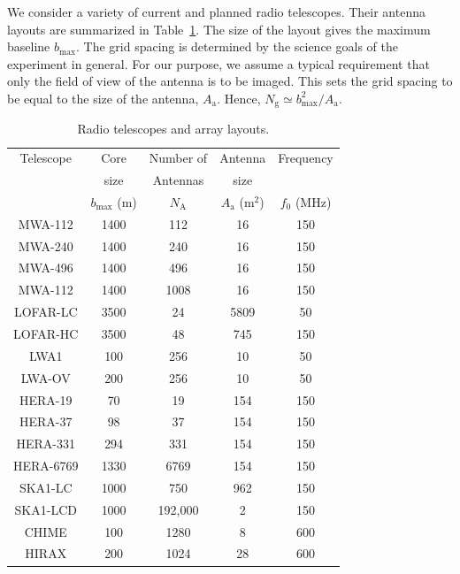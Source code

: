 \documentclass[a4paper,fleqn,usenatbib]{mnras}
\newcommand{\Nant}{N_\textrm{A}}
\newcommand{\Ngrid}{N_\textrm{g}}
\begin{document}
We consider a variety of current and planned radio telescopes. Their antenna 
layouts are summarized in Table~\ref{tab:antenna-layouts}. The size of the 
layout gives the maximum baseline $b_\textrm{max}$. The grid spacing is 
determined by the science goals of the experiment in general. For our 
purpose, we assume a typical requirement that only the field of view of the 
antenna is to be imaged. This sets the grid spacing to be equal to the size 
of the antenna, $A_\textrm{a}$. Hence, 
$\Ngrid\simeq b_\textrm{max}^2/A_\textrm{a}$. 

\begin{table}
  \scriptsize
  \centering
  \caption{Radio telescopes and array layouts.}
  \label{tab:antenna-layouts}
  \begin{threeparttable}
  \begin{tabular}{ccccc} 
    \hline
    Telescope & Core & Number of & Antenna & Frequency \\
              & size & Antennas & size & \\
              & $b_\textrm{max}$ (m) & $\Nant$ & $A_\textrm{a}$ (m$^2$) & $f_0$ (MHz) \\
    \hline
    MWA-112\tnote{a} & 1400 & 112 & 16 & 150 \\
    MWA-240\tnote{a} & 1400 & 240 & 16 & 150 \\
    MWA-496\tnote{a} & 1400 & 496 & 16 & 150 \\
    MWA-112\tnote{a} & 1400 & 1008 & 16 & 150 \\
    LOFAR-LC\tnote{b} & 3500 & 24 & 5809 & 50 \\
    LOFAR-HC\tnote{b} & 3500 & 48 & 745 & 150 \\
    LWA1 & 100 & 256 & 10 & 50 \\
    LWA-OV\tnote{c} & 200 & 256 & 10 & 50 \\
    HERA-19 & 70 & 19 & 154 & 150 \\
    HERA-37 & 98 & 37 & 154 & 150 \\
    HERA-331 & 294 & 331 & 154 & 150 \\
    HERA-6769\tnote{d} & 1330 & 6769 & 154 & 150 \\
    SKA1-LC\tnote{e} & 1000 & 750 & 962 & 150 \\
    SKA1-LCD\tnote{f} & 1000 & 192,000 & 2 & 150 \\
    CHIME & 100 & 1280 & 8 & 600 \\
    HIRAX\tnote{g} & 200 & 1024 & 28 & 600 \\
    \hline
  \end{tabular}

\end{threeparttable}
\end{table}
\end{document}
